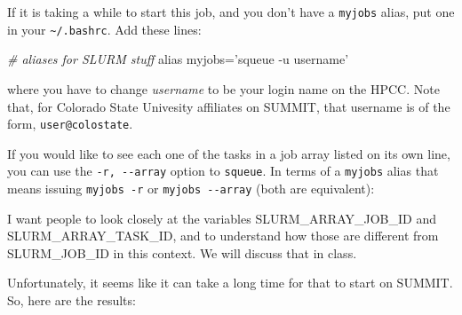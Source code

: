 \documentclass[]{krantz}
\makeatletter
\newenvironment{Shaded}{\begin{snugshade}}{\end{snugshade}}
\newcommand{\BuiltInTok}[1]{#1}
\newcommand{\CommentTok}[1]{\textcolor[rgb]{0.37,0.37,0.37}{\textit{#1}}}
\newcommand{\ExtensionTok}[1]{#1}
\newcommand{\NormalTok}[1]{#1}
\newcommand{\StringTok}[1]{\textcolor[rgb]{0.5,0.5,0.5}{#1}}
\newenvironment{kframe}{%
\medskip{}
\setlength{\fboxsep}{.8em}
 \def\at@end@of@kframe{}%
 \ifinner\ifhmode%
  \def\at@end@of@kframe{\end{minipage}}%
  \begin{minipage}{\columnwidth}%
 \fi\fi%
 \def\FrameCommand##1{\hskip\@totalleftmargin \hskip-\fboxsep
 \colorbox{shadecolor}{##1}\hskip-\fboxsep
     \hskip-\linewidth \hskip-\@totalleftmargin \hskip\columnwidth}%
 \MakeFramed {\advance\hsize-\width
   \@totalleftmargin\z@ \linewidth\hsize
   \@setminipage}}%
 {\par\unskip\endMakeFramed%
 \at@end@of@kframe}
\renewenvironment{Shaded}{\begin{kframe}}{\end{kframe}}
\makeatother
\begin{document}
If it is taking a while to start this job, and you don't have a \texttt{myjobs} alias,
put one in your \texttt{\textasciitilde{}/.bashrc}. Add these lines:

\begin{Shaded}
\begin{Highlighting}[]
\CommentTok{# aliases for SLURM stuff}
\BuiltInTok{alias}\NormalTok{ myjobs=}\StringTok{'squeue -u username'}
\end{Highlighting}
\end{Shaded}

where you have to change \emph{username} to be your login name on the HPCC. Note
that, for Colorado State Univesity affiliates on SUMMIT, that username is of the form,
\texttt{user@colostate}.

If you would like to see each one of the tasks in a job array listed
on its own line, you can use the \texttt{-r,\ -\/-array} option to \texttt{squeue}. In terms
of a \texttt{myjobs} alias that means issuing \texttt{myjobs\ -r} or \texttt{myjobs\ -\/-array} (both are
equivalent):

\begin{Shaded}
\end{Shaded}

I want people to look closely at the variables SLURM\_ARRAY\_JOB\_ID and
SLURM\_ARRAY\_TASK\_ID, and to understand how those are different from
SLURM\_JOB\_ID in this context. We will discuss that in class.

Unfortunately, it seems like it can take a long time for that to start on
SUMMIT. So, here are the results:
\end{document}
